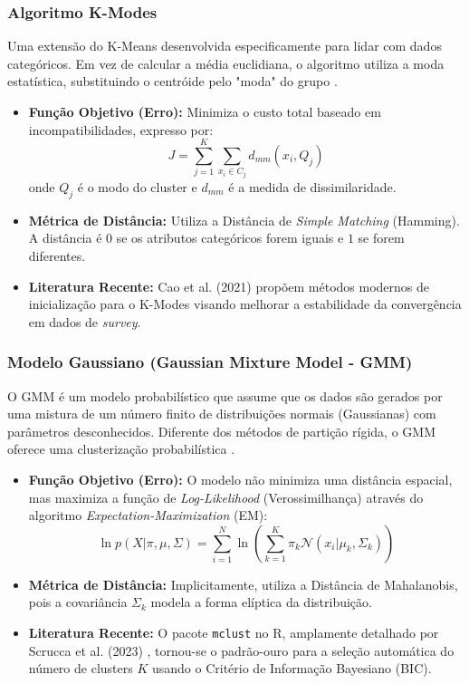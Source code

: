 \documentclass[12pt]{article}
\begin{document}
\subsubsection{Algoritmo K-Modes}
Uma extensão do K-Means desenvolvida especificamente para lidar com dados categóricos. Em vez de calcular a média euclidiana, o algoritmo utiliza a moda estatística, substituindo o centróide pelo "moda" do grupo \cite{huang1998extensions}.
\begin{itemize}
    \item \textbf{Função Objetivo (Erro):} Minimiza o custo total baseado em incompatibilidades, expresso por:
    $$ J = \sum_{j=1}^{K} \sum_{x_i \in C_j} d_{mm}(x_i, Q_j) $$
    onde $Q_j$ é o modo do cluster e $d_{mm}$ é a medida de dissimilaridade.
    \item \textbf{Métrica de Distância:} Utiliza a Distância de \textit{Simple Matching} (Hamming). A distância é $0$ se os atributos categóricos forem iguais e $1$ se forem diferentes.
    \item \textbf{Literatura Recente:} Cao et al. (2021) \cite{cao2021kmodes} propõem métodos modernos de inicialização para o K-Modes visando melhorar a estabilidade da convergência em dados de \textit{survey}.
\end{itemize}

\subsubsection{Modelo Gaussiano (Gaussian Mixture Model - GMM)}
O GMM é um modelo probabilístico que assume que os dados são gerados por uma mistura de um número finito de distribuições normais (Gaussianas) com parâmetros desconhecidos. Diferente dos métodos de partição rígida, o GMM oferece uma clusterização probabilística \cite{scrucca2016mclust}.
\begin{itemize}
    \item \textbf{Função Objetivo (Erro):} O modelo não minimiza uma distância espacial, mas maximiza a função de \textit{Log-Likelihood} (Verossimilhança) através do algoritmo \textit{Expectation-Maximization} (EM):
    $$ \ln p(X|\pi, \mu, \Sigma) = \sum_{i=1}^{N} \ln \left( \sum_{k=1}^{K} \pi_k \mathcal{N}(x_i | \mu_k, \Sigma_k) \right) $$
    \item \textbf{Métrica de Distância:} Implicitamente, utiliza a Distância de Mahalanobis, pois a covariância $\Sigma_k$ modela a forma elíptica da distribuição.
    \item \textbf{Literatura Recente:} O pacote \texttt{mclust} no R, amplamente detalhado por Scrucca et al. (2023) \cite{scrucca2023mclust}, tornou-se o padrão-ouro para a seleção automática do número de clusters $K$ usando o Critério de Informação Bayesiano (BIC).
\end{itemize}
\end{document}
